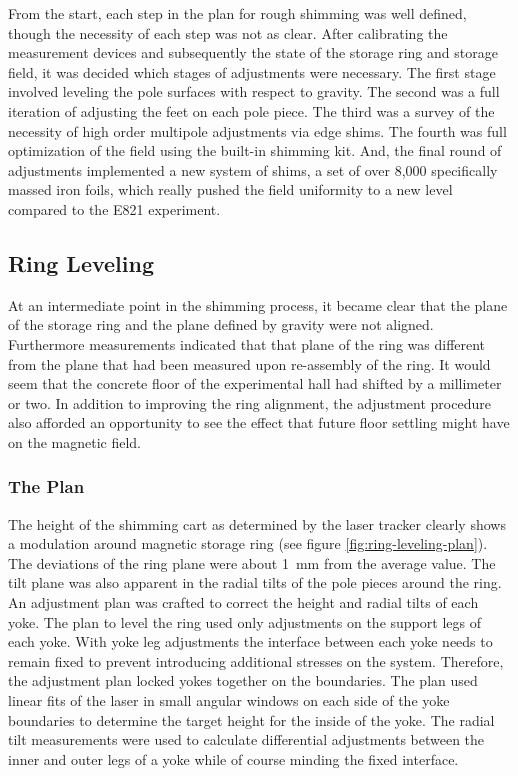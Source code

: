 From the start, each step in the plan for rough shimming was well defined, though the necessity of each step was not as clear.  After calibrating the measurement devices and subsequently the state of the storage ring and storage field, it was decided which stages of adjustments were necessary.  The first stage involved leveling the pole surfaces with respect to gravity.  The second was a full iteration of adjusting the feet on each pole piece.  The third was a survey of the necessity of high order multipole adjustments via edge shims.  The fourth was full optimization of the field using the built-in shimming kit.  And, the final round of adjustments implemented a new system of shims, a set of over 8,000 specifically massed iron foils, which really pushed the field uniformity to a new level compared to the E821 experiment.

\subsection{Ring Leveling}
At an intermediate point in the shimming process, it became clear that the plane of the storage ring and the plane defined by gravity were not aligned.  Furthermore measurements indicated that that plane of the ring was different from the plane that had been measured upon re-assembly of the ring.  It would seem that the concrete floor of the experimental hall had shifted by a millimeter or two.  In addition to improving the ring alignment, the adjustment procedure also afforded an opportunity to see the effect that future floor settling might have on the magnetic field.

\subsubsection{The Plan}
The height of the shimming cart as determined by the laser tracker clearly shows a modulation around magnetic storage ring (see figure \ref{fig:ring-leveling-plan}).  The deviations of the ring plane were about \SI{1}{\milli\meter} from the average value.  The tilt plane was also apparent in the radial tilts of the pole pieces around the ring.  An adjustment plan was crafted to correct the height and radial tilts of each yoke.  The plan to level the ring used only adjustments on the support legs of each yoke. With yoke leg adjustments the interface between each yoke needs to remain fixed to prevent introducing additional stresses on the system.  Therefore, the adjustment plan locked yokes together on the boundaries.  The plan used linear fits of the laser in small angular windows on each side of the yoke boundaries to determine the target height for the inside of the yoke.  The radial tilt measurements were used to calculate differential adjustments between the inner and outer legs of a yoke while of course minding the fixed interface. 

